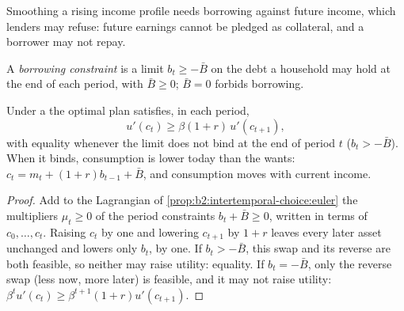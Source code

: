 Smoothing a rising income profile needs borrowing against future income, which lenders may refuse:
future earnings cannot be pledged as collateral, and a borrower may not repay.

\begin{definition}\label{def:b2:intertemporal-choice:borrowing-constraint}
A \emph{borrowing constraint} is a limit $b_t \ge -\bar B$ on the debt a
household may hold at the end of each period, with $\bar B \ge 0$; $\bar B = 0$ forbids borrowing.
\end{definition}

\begin{proposition}\label{prop:b2:intertemporal-choice:constrained}
Under a  the optimal plan satisfies, in each period,
\[
u'(c_t) \ge \beta(1 + r)\, u'(c_{t+1}),
\]
with equality whenever the limit does not bind at the end of period $t$ ($b_t > -\bar B$). When it
binds, consumption is lower today than the  wants: $c_t = m_t + (1 + r)b_{t-1} + \bar B$,
and consumption moves with current income.
\end{proposition}

\begin{proof}
Add to the Lagrangian of \cref{prop:b2:intertemporal-choice:euler} the multipliers $\mu_t \ge 0$ of the
period constraints $b_t + \bar B \ge 0$, written in terms of $c_0, \dots, c_t$. Raising $c_t$ by one and
lowering $c_{t+1}$ by $1 + r$ leaves every later asset unchanged and lowers only $b_t$, by one. If
$b_t > -\bar B$, this swap and its reverse are both feasible, so neither may raise utility: equality. If
$b_t = -\bar B$, only the reverse swap (less now, more later) is feasible, and it may not raise
utility: $\beta^{t}u'(c_t) \ge \beta^{t+1}(1 + r)u'(c_{t+1})$.
\end{proof}

